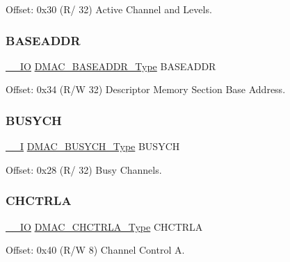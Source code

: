 Offset\+: 0x30 (R/ 32) Active Channel and Levels. 

\mbox{\label{struct_dmac_a0d16ac99028838e03c07101c9461a101}} 
\subsubsection{\texorpdfstring{BASEADDR}{BASEADDR}}
{\footnotesize\ttfamily \mbox{\hyperlink{core__cm0plus_8h_aec43007d9998a0a0e01faede4133d6be}{\+\_\+\+\_\+\+IO}} \mbox{\hyperlink{union_d_m_a_c___b_a_s_e_a_d_d_r___type}{D\+M\+A\+C\+\_\+\+B\+A\+S\+E\+A\+D\+D\+R\+\_\+\+Type}} B\+A\+S\+E\+A\+D\+DR}



Offset\+: 0x34 (R/W 32) Descriptor Memory Section Base Address. 

\mbox{\label{struct_dmac_a27fb47563710a73c606be602d1511591}} 
\subsubsection{\texorpdfstring{BUSYCH}{BUSYCH}}
{\footnotesize\ttfamily \mbox{\hyperlink{core__cm0plus_8h_af63697ed9952cc71e1225efe205f6cd3}{\+\_\+\+\_\+I}} \mbox{\hyperlink{union_d_m_a_c___b_u_s_y_c_h___type}{D\+M\+A\+C\+\_\+\+B\+U\+S\+Y\+C\+H\+\_\+\+Type}} B\+U\+S\+Y\+CH}



Offset\+: 0x28 (R/ 32) Busy Channels. 

\mbox{\label{struct_dmac_a67ecb1bfb5647ab51566b780cc945203}} 
\subsubsection{\texorpdfstring{CHCTRLA}{CHCTRLA}}
{\footnotesize\ttfamily \mbox{\hyperlink{core__cm0plus_8h_aec43007d9998a0a0e01faede4133d6be}{\+\_\+\+\_\+\+IO}} \mbox{\hyperlink{union_d_m_a_c___c_h_c_t_r_l_a___type}{D\+M\+A\+C\+\_\+\+C\+H\+C\+T\+R\+L\+A\+\_\+\+Type}} C\+H\+C\+T\+R\+LA}



Offset\+: 0x40 (R/W 8) Channel Control A. 

\mbox{\label{struct_dmac_a016e66155d79c414f5deb16a30e5caeb}} 
